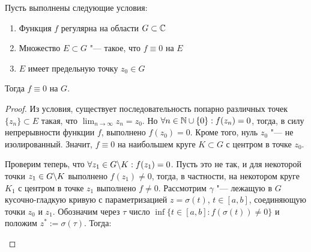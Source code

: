 \begin{theorem}
	Пусть выполнены следующие условия:
	\begin{enumerate}
		\item Функция $f$ регулярна на области $G \subset \mathbb{C}$
		\item Множество $E \subset G$ "--- такое, что $f \equiv 0$ на $E$
		\item $E$ имеет предельную точку $z_0 \in G$
	\end{enumerate}
	
	Тогда $f \equiv 0$ на $G$.
\end{theorem}

\begin{proof}
	Из условия, существует последовательность попарно различных точек $\{z_n\} \subset E$ такая, что $\lim_{n \to \infty}z_n = z_0$. Но $\forall n \in \mathbb{N} \cup \{0\}: f(z_n) = 0$, тогда, в силу непрерывности функции $f$, выполнено $f(z_0) = 0$. Кроме того, нуль $z_0$ "--- не изолированный. Значит, $f \equiv 0$ на наибольшем круге $K \subset G$ с центром в точке $z_0$.
	
	Проверим теперь, что $\forall z_1 \in G \backslash K : f(z_1) = 0$. Пусть это не так, и для некоторой точки $z_1 \in G \backslash K$ выполнено $f(z_1) \ne 0$, тогда, в частности, на некотором круге $K_1$ с центром в точке $z_1$ выполнено $f \ne 0$. Рассмотрим $\gamma$ "--- лежащую в $G$ кусочно-гладкую кривую с параметризацией $z = \sigma(t)$, $t \in [a, b]$, соединяющую точки $z_0$ и $z_1$. Обозначим через $\tau$ число $\inf\{t \in [a, b]: f(\sigma(t)) \ne 0\}$ и положим $z^* := \sigma(\tau)$. Тогда:
	\begin{center}
\end{center}
\end{proof}
